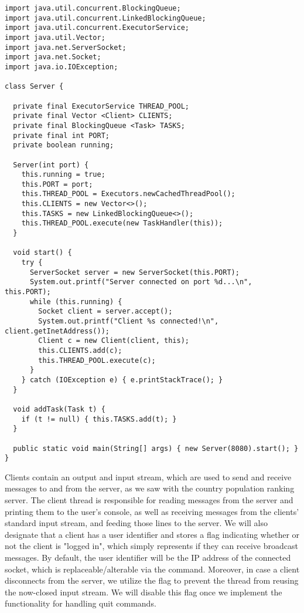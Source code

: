 \begin{lstlisting}[language=MyJava]
import java.util.concurrent.BlockingQueue;
import java.util.concurrent.LinkedBlockingQueue;
import java.util.concurrent.ExecutorService;
import java.util.Vector;
import java.net.ServerSocket;
import java.net.Socket;
import java.io.IOException;

class Server {

  private final ExecutorService THREAD_POOL;
  private final Vector <Client> CLIENTS;
  private final BlockingQueue <Task> TASKS;
  private final int PORT;
  private boolean running;

  Server(int port) {
    this.running = true;
    this.PORT = port;
    this.THREAD_POOL = Executors.newCachedThreadPool();
    this.CLIENTS = new Vector<>();
    this.TASKS = new LinkedBlockingQueue<>();
    this.THREAD_POOL.execute(new TaskHandler(this));
  }

  void start() {
    try {
      ServerSocket server = new ServerSocket(this.PORT);
      System.out.printf("Server connected on port %d...\n", this.PORT);
      while (this.running) {
        Socket client = server.accept();
        System.out.printf("Client %s connected!\n", client.getInetAddress());
        Client c = new Client(client, this);
        this.CLIENTS.add(c);
        this.THREAD_POOL.execute(c);
      }
    } catch (IOException e) { e.printStackTrace(); }
  }

  void addTask(Task t) {
    if (t != null) { this.TASKS.add(t); }
  }

  public static void main(String[] args) { new Server(8080).start(); }
}
\end{lstlisting}

Clients contain an output and input stream, which are used to send and receive messages to and from the server, as we saw with the country population ranking server. The client thread is responsible for reading messages from the server and printing them to the user's console, as well as receiving messages from the clients' standard input stream, and feeding those lines to the server. We will also designate that a client has a user identifier and stores a flag indicating whether or not the client is "logged in", which simply represents if they can receive broadcast messages. By default, the user identifier will be the IP address of the connected socket, which is replaceable/alterable via the  command. Moreover, in case a client disconnects from the server, we utilize the  flag to prevent the thread from reusing the now-closed input stream. We will disable this flag once we implement the functionality for handling quit commands.


